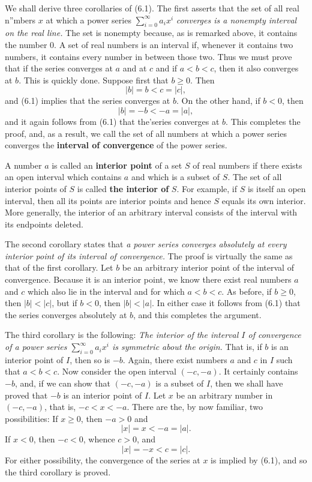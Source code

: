 We shall derive three corollaries of (6.1). The first asserts that the set of all real n''mbers $x$ at which a power series $\sum_{i=0}^\infty a_{i}x^i$ \textit{converges is a nonempty interval on the real line.} The set is nonempty because, as is remarked above, it contains the number 0. A set of real numbers is an interval if, whenever it contains two numbers, it contains every number in between those two. Thus we must prove that if the series converges at $a$ and at $c$ and if $a < b < c$, then it also converges at $b$. This is quickly done. Suppose first that $b \geq 0$. Then
$$
|b| = b < c = |c|,
$$
\noindent and (6.1) implies that the series converges at $b$. On the other hand, if $b < 0$, then
$$
|b| = -b < -a = |a|,
$$
\noindent and it again follows from (6.1) that the'series converges at $b$. This completes the proof, and, as a result, we call the set of all numbers at which a power series converges the \textbf{interval of convergence} of the power series.

A number $a$ is called an \textbf{interior point} of a set $S$ of real numbers if there exists an open interval which contains $a$ and which is a subset of $S$. The set of all interior points of $S$ is called \textbf{the interior of} $S$. For example, if $S$ is itself an open interval, then all its points are interior points and hence $S$ equals its own interior. More generally, the interior of an arbitrary interval consists of the interval with its endpoints deleted.

The second corollary states that \textit{a power series converges absolutely at every interior point of its interval of convergence.} The proof is virtually the same as that of the first corollary. Let $b$ be an arbitrary interior point of the interval of convergence. Because it is an interior point, we know there exist
real numbers $a$ and $c$ which also lie in the interval and for which $a < b < c$. As before, if $b \geq 0$, then $|b| < |c|$, but if $b < 0$, then $|b| < |a|$. In either case it follows from (6.1) that the series converges absolutely at $b$, and this completes the argument.

The third corollary is the following: \textit{The interior of the interval $I$ of convergence of a power series $\sum_{i=0}^\infty a_{i}x^i$ is symmetric about the origin.} That is, if $b$ is an interior point of $I$, then so is $-b$. Again, there exist numbers $a$ and $c$ in $I$ such that $a < b < c$. Now consider the open interval $(-c, -a)$. It certainly contains $-b$, and, if we can show that $(-c, -a)$ is a subset of $I$, then we shall have proved that $-b$ is an interior point of $I$. Let $x$ be an arbitrary number in $(-c, -a)$, that is, $-c < x < -a$. There are the, by now familiar, two possibilities: If $x \geq 0$, then $-a > 0$ and
$$
|x| = x < -a = |a|.
$$
\noindent If $x < 0$, then $-c < 0$, whence $c > 0$, and
$$
|x| = -x < c = |c|.
$$
\noindent For either possibility, the convergence of the series at $x$ is implied by (6.1), and so the third corollary is proved.

